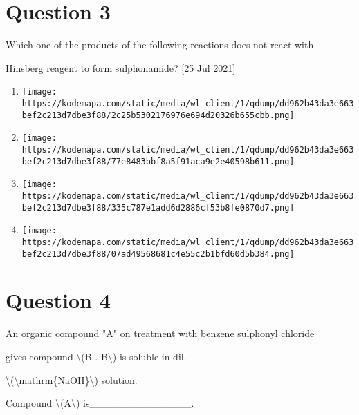 \documentclass{article}
\begin{document}
\section*{Question 3}
Which one of the products of the following reactions does not react with

Hinsberg reagent to form sulphonamide? {[}25 Jul 2021{]}


\begin{enumerate}[label=(\alph*)]
\item \texttt{[image: https://kodemapa.com/static/media/wl\_client/1/qdump/dd962b43da3e663bef2c213d7dbe3f88/2c25b5302176976e694d20326b655cbb.png]}


\item \texttt{[image: https://kodemapa.com/static/media/wl\_client/1/qdump/dd962b43da3e663bef2c213d7dbe3f88/77e8483bbf8a5f91aca9e2e40598b611.png]}


\item \texttt{[image: https://kodemapa.com/static/media/wl\_client/1/qdump/dd962b43da3e663bef2c213d7dbe3f88/335c787e1add6d2886cf53b8fe0870d7.png]}


\item \texttt{[image: https://kodemapa.com/static/media/wl\_client/1/qdump/dd962b43da3e663bef2c213d7dbe3f88/07ad49568681c4e55c2b1bfd60d5b384.png]}


\end{enumerate}
\newpage
\section*{Question 4}
An organic compound "A" on treatment with benzene sulphonyl chloride

gives compound \textbackslash(B . B\textbackslash) is soluble in dil.

\textbackslash(\textbackslash mathrm\{NaOH\}\textbackslash) solution.~



Compound \textbackslash(A\textbackslash) is\_\_\_\_\_\_\_\_\_\_\_\_\_\_.
\end{document}
